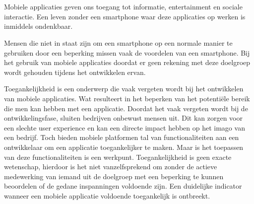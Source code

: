 
\chapter{}
\label{ch:inleiding}


\section{}
\label{sec:probleemstelling}
Mobiele applicaties geven ons toegang tot informatie, entertainment en sociale interactie. Een leven zonder een smartphone waar deze applicaties op werken is inmiddels ondenkbaar. 

Mensen die niet in staat zijn om een smartphone op een normale manier te gebruiken door een beperking missen vaak de voordelen van een smartphone. Bij het gebruik van mobiele applicaties doordat er geen rekening met deze doelgroep wordt gehouden tijdens het ontwikkelen ervan.

Toegankelijkheid is een onderwerp die vaak vergeten wordt bij het ontwikkelen van mobiele applicaties. Wat resulteert in het beperken van het potentiële bereik die men kan hebben met een applicatie.  Doordat het vaak vergeten wordt bij de ontwikkelingsfase, sluiten bedrijven onbewust mensen uit. Dit kan zorgen voor een slechte user experience en kan een directe impact hebben op het imago van een bedrijf. Toch bieden mobiele platformen tal van functionaliteiten aan een ontwikkelaar om een applicatie toegankelijker te maken. Maar is het toepassen van deze functionaliteiten is een werkpunt. Toegankelijkheid is geen exacte wetenschap, hierdoor is het niet vanzelfsprekend om zonder de actieve medewerking van iemand uit de doelgroep met een beperking te kunnen beoordelen of de gedane inspanningen voldoende zijn. Een duidelijke indicator wanneer een mobiele applicatie voldoende toegankelijk is ontbreekt. 


